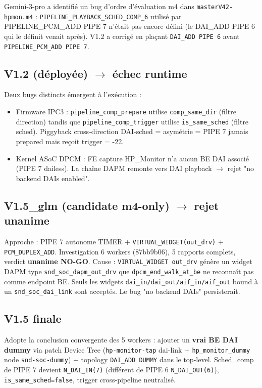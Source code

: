 \documentclass[11pt,a4paper]{article}
\begin{document}
Gemini-3-pro a identifié un bug d'ordre d'évaluation m4 dans \texttt{masterV42-hpmon.m4} : \texttt{PIPELINE\_PLAYBACK\_SCHED\_COMP\_6} utilisé par PIPELINE\_PCM\_ADD PIPE 7 n'était pas encore défini (le DAI\_ADD PIPE 6 qui le définit venait après). V1.2 a corrigé en plaçant \texttt{DAI\_ADD PIPE 6} avant \texttt{PIPELINE\_PCM\_ADD PIPE 7}.

\subsection{V1.2 (déployée) $\to$ échec runtime}

Deux bugs distincts émergent à l'exécution :
\begin{itemize}[leftmargin=*, itemsep=1pt]
  \item Firmware IPC3 : \texttt{pipeline\_comp\_prepare} utilise \texttt{comp\_same\_dir} (filtre direction) tandis que \texttt{pipeline\_comp\_trigger} utilise \texttt{is\_same\_sched} (filtre sched). Piggyback cross-direction DAI-sched = asymétrie = PIPE 7 jamais prepared mais reçoit trigger = -22.
  \item Kernel ASoC DPCM : FE capture HP\_Monitor n'a aucun BE DAI associé (PIPE 7 dailess). La chaîne DAPM remonte vers DAI playback $\to$ rejet "no backend DAIs enabled".
\end{itemize}

\subsection{V1.5\_glm (candidate m4-only) $\to$ rejet unanime}

Approche : PIPE 7 autonome TIMER + \texttt{VIRTUAL\_WIDGET(out\_drv)} + \texttt{PCM\_DUPLEX\_ADD}. Investigation 6 workers (87bb9b06), 5 rapports complets, verdict \textbf{unanime NO-GO}. Cause : \texttt{VIRTUAL\_WIDGET out\_drv} génère un widget DAPM type \texttt{snd\_soc\_dapm\_out\_drv} que \texttt{dpcm\_end\_walk\_at\_be} ne reconnaît pas comme endpoint BE. Seuls les widgets \texttt{dai\_in/dai\_out/aif\_in/aif\_out} bound à un \texttt{snd\_soc\_dai\_link} sont acceptés. Le bug "no backend DAIs" persisterait.

\subsection{V1.5 finale}

Adopte la conclusion convergente des 5 workers : ajouter un \textbf{vrai BE DAI dummy} via patch Device Tree (\texttt{hp-monitor-tap} dai-link + \texttt{hp\_monitor\_dummy} node \texttt{snd-soc-dummy}) + topology \texttt{DAI\_ADD DUMMY} dans le top-level. Sched\_comp de PIPE 7 devient \texttt{N\_DAI\_IN(7)} (différent de PIPE 6 \texttt{N\_DAI\_OUT(6)}), \texttt{is\_same\_sched=false}, trigger cross-pipeline neutralisé.
\end{document}
